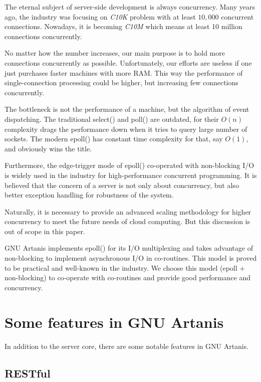 \documentclass[numbers,numberedpars]{sigplanconf}
\begin{document}
The eternal subject of server-side development is always concurrency.
Many years ago, the industry was focusing on {\it C10K} problem with at least $10,000$ concurrent connections. Nowadays, it is becoming {\it C10M} which means at least 10 million connections concurrently.

No matter how the number increases, our main purpose is to hold more connections concurrently as possible. Unfortunately, our efforts are useless if one just purchases faster machines with more RAM. This way the performance of single-connection
processing could be higher, but increasing few connections concurrently.

The bottleneck is not the performance of a machine, but the algorithm of event dispatching. The traditional select() and poll() are outdated, for their $O(n)$ complexity drags the performance down when it tries to query large number of sockets. 
The modern epoll() has constant time complexity for that, say $O(1)$, and obviously wins the title.

Furthermore, the edge-trigger mode of epoll() co-operated with non-blocking I/O is widely used in the industry for high-performance concurrent programming.
It is believed that the concern of a server is not only about concurrency, but also better exception handling for robustness of the system.

Naturally, it is necessary to provide an advanced scaling methodology for higher concurrency to meet the future needs of cloud computing. But this discussion is out
of scope in this paper.

GNU Artanis implements epoll() for its I/O multiplexing and takes advantage of 
non-blocking to implement asynchronous I/O in co-routines. This model is proved to be practical and well-known in the industry. We choose this model (epoll + non-blocking) to co-operate with co-routines and provide good performance and concurrency.

\section{Some features in GNU Artanis} \label{Some features in GNU Artanis}

In addition to the server core, there are some notable features in GNU Artanis.

\subsection{RESTful}
\end{document}
